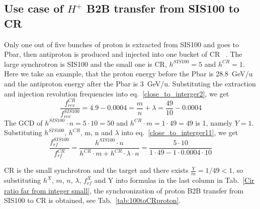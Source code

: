 \subsection{Use case of $H^{+}$ B2B transfer from SIS100 to CR} 
Only one out of five bunches of proton is extracted from SIS100 and goes to Pbar, then antiproton is produced and  injected into one bucket of CR ~\cite{steck_demonstration_2011}. The large synchrotron is SIS100 and the small one is CR, $h^{\mathit{SIS100}}=5$ and $h^{\mathit{CR}}=1$. Here we take an example, that the proton energy before the Pbar is \SI{28.8}{GeV/\atomicmassunit} and the antiproton energy after the Pbar is \SI{3}{GeV/\atomicmassunit}. Substituting the extraction and injection revolution frequencies into eq.~\ref{close_to_interger2}, we get
\begin{equation} 
\frac{f_{\mathit{rev}}^{\mathit{CR}}}{f_{\mathit{rev}}^{\mathit{SIS100}}}=4.9-0.0004=\frac{m}{n}+ \lambda=\frac{49}{10}-0.0004
\end{equation}
The GCD of $h^{\mathit{SIS100}}\cdot n=5\cdot10=50$ and $h^{\mathit{CR}} \cdot m=1\cdot 49=49$ is 1, namely $Y=1$. Substituting $h^{\mathit{SIS100}}$, $h^{\mathit{CR}}$, m, n and $\lambda$ into eq.~\ref{close_to_interger11}, we get
\begin{equation} 
\frac{f_{\mathit{rf}}^{\mathit{SIS100}}}{f_{\mathit{rf}}^{\mathit{CR}}}=\frac{h^{\mathit{SIS100}}\cdot n}{h^{\mathit{CR}} \cdot m+ h^{\mathit{CR}} \cdot\lambda\cdot n}=\frac{5\cdot 10}{1 \cdot 49- 1 \cdot0.0004\cdot 10}
\end{equation}

CR is the small synchrotron and the target and there exists $\frac{Y}{m}=1/49<1$, so substituting $h^X$, $m$, $n$, $\lambda$, $f_{\mathit{rf}}^{X}$ and Y into formulas in the last column in Tab.~\ref{Cir ratio far from integer small}, the synchronization of proton B2B transfer from SIS100 to CR is obtained, see Tab.~\ref{tab:100toCRproton}.

